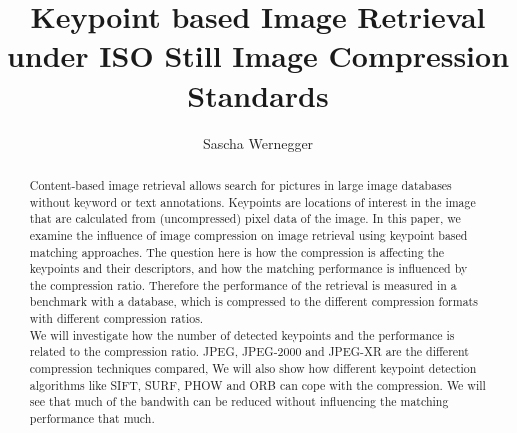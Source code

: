 \documentclass[10pt,a4paper]{article}
\author{Sascha Wernegger}
\title{Keypoint based Image Retrieval under ISO Still Image Compression Standards}
\begin{document}
\maketitle

\begin{abstract}
Content-based image retrieval allows search for pictures in large image databases without keyword or text annotations. Keypoints are locations of interest in the image that  are calculated from (uncompressed) pixel data of the image. In this paper, we examine the influence of image compression on image retrieval using keypoint based matching approaches. The question here is how the compression is affecting the keypoints and their descriptors, and how the matching performance is influenced by the compression ratio. Therefore the performance of the retrieval is measured in a benchmark with a database, which is compressed to the different compression formats with different compression ratios. \\
We will investigate how the number of detected keypoints and the performance is related to the compression ratio. JPEG, JPEG-2000 and JPEG-XR are the different compression techniques compared, %
We will also show how different keypoint detection algorithms like SIFT, SURF, PHOW and ORB can cope with the compression. We will see that much of the bandwith can be reduced without influencing the matching performance that much.
\end{abstract}
\end{document}
